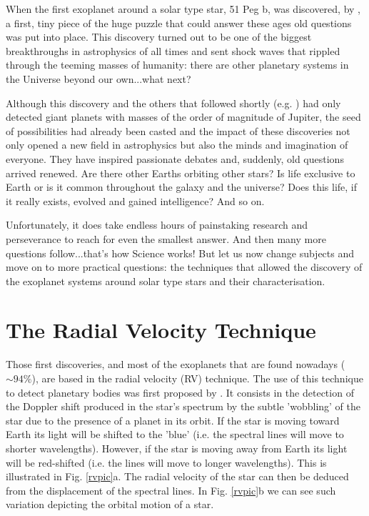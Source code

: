 \documentclass[dvips,12pt,a4paper]{report}
\begin{document}
When the first exoplanet around a solar type star, 51 Peg b, was discovered, by \citet{Mayor-1995}, %
a first, tiny piece of the huge puzzle that could answer these ages old questions was put into place. This discovery turned out to be one of the biggest breakthroughs in astrophysics of all times and sent shock waves that rippled through the teeming masses of humanity: there are other planetary systems in the Universe beyond our own...what next?

\indent Although this discovery and the others that followed shortly (e.g. \citeauthor{Marcy-1996} \citeyear{Marcy-1996}) had only detected giant planets with masses of the order of magnitude of Jupiter, the seed of possibilities had already been casted and the impact of these discoveries not only  opened a new field in astrophysics but also the minds and imagination of everyone. They have inspired passionate debates and, suddenly, old questions arrived renewed. Are there other Earths orbiting other stars? Is life exclusive to Earth or is it common throughout the galaxy and the universe? Does this life, if it really exists, evolved and gained intelligence? And so on. 

Unfortunately, it does take endless hours of painstaking research and perseverance to reach for even the smallest answer. And then many more questions follow...that's how Science works! But let us now change subjects and move on to more practical questions: the techniques that allowed the discovery of the exoplanet systems around solar type stars and their characterisation.


\section{The Radial Velocity Technique}

Those first discoveries, and most of the exoplanets that are found nowadays ($\sim 94\%$), are based in the radial velocity (RV) technique. The use of this technique to detect planetary bodies was first proposed by \citet{Struve-1952}. It consists in the detection of the Doppler shift produced in the star's spectrum  by the subtle 'wobbling' of the star due to the presence of a planet in its orbit. If the star is moving toward Earth its light will be shifted to the 'blue' (i.e. the spectral lines will move to shorter wavelengths). However, if the star is moving away from Earth its light will be red-shifted (i.e. the lines will move to longer wavelengths). This is illustrated in Fig. \ref{rvpic}a. The radial velocity of the star can then be deduced from the displacement of the spectral lines. In Fig. \ref{rvpic}b we can see such variation depicting the orbital motion of a star. 
\end{document}
